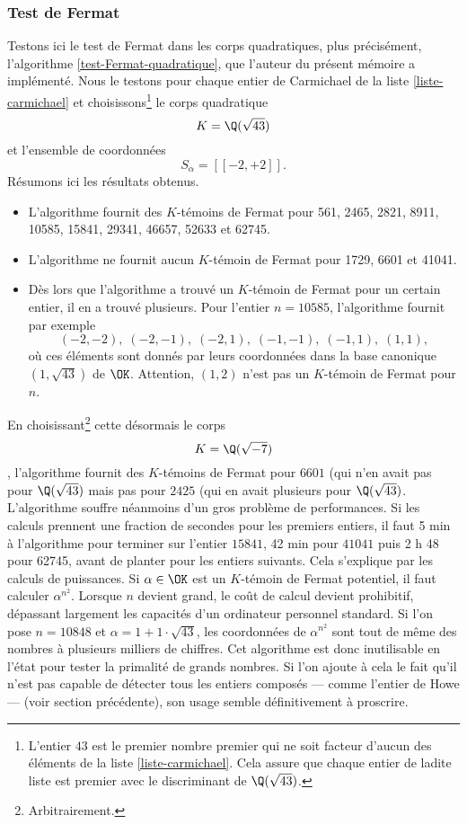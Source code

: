 \subsubsection{Test de Fermat}

Testons ici le test de Fermat dans les corps quadratiques, plus précisément, l'algorithme \ref{test-Fermat-quadratique}, que l'auteur du présent mémoire a implémenté. Nous le testons pour chaque entier de Carmichael de la liste \ref{liste-carmichael} et choisissons\footnote{L'entier $43$ est le premier nombre premier qui ne soit facteur d'aucun des éléments de la liste \ref{liste-carmichael}. Cela assure que chaque entier de ladite liste est premier avec le discriminant de $\Q(\sqrt{43})$.} le corps quadratique \[K = \Q(\sqrt{43})\] et l'ensemble de coordonnées \[S_\alpha = [\![-2, +2]\!].\] Résumons ici les résultats obtenus.
\begin{itemize}
	\item L'algorithme fournit des $K$-témoins de Fermat pour 561, 2465, 2821, 8911, 10585, 15841, 29341, 46657, 52633 et 62745.
	\item L'algorithme ne fournit aucun $K$-témoin de Fermat pour 1729, 6601 et 41041.
	\item Dès lors que l'algorithme a trouvé un $K$-témoin de Fermat pour un certain entier, il en a trouvé plusieurs. Pour l'entier $n = 10585$, l'algorithme fournit par exemple \[(-2, -2), \; (-2, -1), \; (-2, 1), \; (-1, -1), \; (-1, 1), \; (1, 1),\] où ces éléments sont donnés par leurs coordonnées dans la base canonique $(1, \sqrt{43})$ de $\OK$. Attention, $(1, 2)$ n'est pas un $K$-témoin de Fermat pour $n$.
\end{itemize}

En choisissant\footnote{Arbitrairement.} cette désormais le corps \[K = \Q(\sqrt{-7})\], l'algorithme fournit des $K$-témoins de Fermat pour $6601$ (qui n'en avait pas pour $\Q(\sqrt{43})$ mais pas pour $2425$ (qui en avait plusieurs pour $\Q(\sqrt{43})$. \\

L'algorithme souffre néanmoins d'un gros problème de performances. Si les calculs prennent une fraction de secondes pour les premiers entiers, il faut 5 min à l'algorithme pour terminer sur l'entier $15841$, 42 min pour $41041$ puis 2 h 48 pour 62745, avant de planter pour les entiers suivants. Cela s'explique par les calculs de puissances. Si $\alpha\in \OK$ est un $K$-témoin de Fermat potentiel, il faut calculer $\alpha^{n^2}$. Lorsque $n$ devient grand, le coût de calcul devient prohibitif, dépassant largement les capacités d'un ordinateur personnel standard. Si l'on pose $n = 10848$ et $\alpha = 1 + 1\cdot \sqrt{43}$, les coordonnées de $\alpha^{n^2}$ sont tout de même des nombres à plusieurs milliers de chiffres. Cet algorithme est donc inutilisable en l'état pour tester la primalité de grands nombres. Si l'on ajoute à cela le fait qu'il n'est pas capable de détecter tous les entiers composés — comme l'entier de Howe — (voir section précédente), son usage semble définitivement à proscrire.
	

